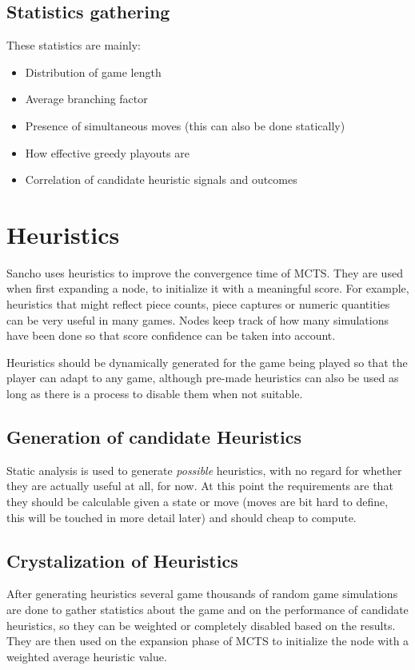 \subsection{Statistics gathering}
These statistics are mainly:
\begin{itemize}
	\item Distribution of game length
	
	\item Average branching factor
	
	\item Presence of simultaneous moves (this can also be done statically)
	
	\item How effective greedy playouts are
	
	\item Correlation of candidate heuristic signals and outcomes
\end{itemize}



\section{Heuristics}
Sancho uses heuristics to improve the convergence time of MCTS. They are used when first expanding a node, to initialize it with a meaningful score. For example, heuristics that might reflect piece counts, piece captures or numeric quantities can be very useful in many games. Nodes keep track of how many simulations have been done so that score confidence can be taken into account. 

Heuristics should be dynamically generated for the game being played so that the player can adapt to any game, although pre-made heuristics can also be used as long as there is a process to disable them when not suitable.


\subsection{Generation of candidate Heuristics}
Static analysis is used to generate \textit{possible} heuristics, with no regard for whether they are actually useful at all, for now. At this point the requirements are that they should be calculable given a state or move (moves are bit hard to define, this will be touched in more detail later) and should cheap to compute.


\subsection{Crystalization of Heuristics}
After generating heuristics several game thousands of random game simulations are done to gather statistics about the game and on the performance of candidate heuristics, so they can be weighted or completely disabled based on the results. They are then used  on the expansion phase of MCTS to initialize the node with a weighted average heuristic value.


